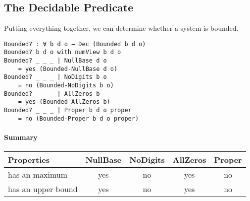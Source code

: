 \documentclass[\main/thesis.tex]{subfiles}
\begin{document}
\subsection{The Decidable Predicate}

Putting everything together, we can determine whether a system is bounded.

\begin{lstlisting}
Bounded? : ∀ b d o → Dec (Bounded b d o)
Bounded? b d o with numView b d o
Bounded? _ _ _ | NullBase d o
    = yes (Bounded-NullBase d o)
Bounded? _ _ _ | NoDigits b o
    = no (Bounded-NoDigits b o)
Bounded? _ _ _ | AllZeros b
    = yes (Bounded-AllZeros b)
Bounded? _ _ _ | Proper b d o proper
    = no (Bounded-Proper b d o proper)
\end{lstlisting}

\paragraph{Summary}

\begin{center}
    \begin{adjustbox}{max width=\textwidth}
    \begin{tabular}{ | l | c | c | c | c | }
    \textbf{Properties} & \textbf{NullBase} & \textbf{NoDigits} & \textbf{AllZeros} & \textbf{Proper} \\
    \hline
    has an maximum     & yes & no & yes & no \\
    has an upper bound & yes & no & yes & no \\
    \end{tabular}
    \end{adjustbox}
\end{center}
\end{document}
